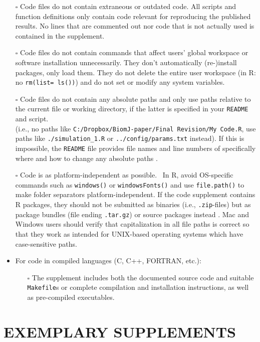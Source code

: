 \documentclass[
  paper=a4,
  ,captions=tableheading
]{scrartcl}
\providecommand{\tightlist}{%
  \setlength{\itemsep}{0pt}\setlength{\parskip}{0pt}}
\let\oldtexttt\texttt
\renewcommand{\texttt}[1]{\colorbox{bgcolor}{\small \oldtexttt{#1}}}
\begin{document}
\begin{itemize}
\item[$\square$]
  Code files do not contain extraneous or outdated code. All scripts and function definitions only contain code relevant for reproducing the published results. No lines that are commented out nor code that is not actually used is contained in the supplement.
\item[$\square$]
  Code files do not contain commands that affect users' global workspace or software installation unnecessarily. They don't automatically (re-)install packages, only load them. They do not delete the entire user workspace (in R: no \texttt{rm(list=\ ls())}) and do not set or modify any system variables.
\item[$\square$]
  Code files do not contain any absolute paths and only use paths relative to the current file or working directory, if the latter is specified in your \texttt{README} and script.\\
  (i.e., no paths like \texttt{C:/Dropbox/BiomJ-paper/Final\ Revision/My\ Code.R}, use paths like \texttt{./simulation\_1.R} or \texttt{../config/params.txt} instead). If this is impossible, the \texttt{README} file provides file names and line numbers of specifically where and how to change any absolute paths .
\item[$\square$]
  Code is as platform-independent as possible.~
  In R, avoid OS-specific commands such as \texttt{windows()} or \texttt{windowsFonts()} and use \texttt{file.path()} to make folder separators platform-independent. If the code supplement contains R packages, they should not be submitted as binaries (i.e., \texttt{.zip}-files) but as package bundles (file ending \texttt{.tar.gz}) or source packages instead . Mac and Windows users should verify that capitalization in all file paths is correct so that they work as intended for UNIX-based operating systems which have case-sensitive paths.
\item
  For code in compiled languages (C, C++, FORTRAN, etc.):

  \begin{itemize}
  \tightlist
  \item[$\square$]
    The supplement includes both the documented source code and suitable \texttt{Makefile}s or complete compilation and installation instructions, as well as pre-compiled executables.
  \end{itemize}
\end{itemize}

\section{EXEMPLARY SUPPLEMENTS}\label{exemplary-supplements}
\end{document}
